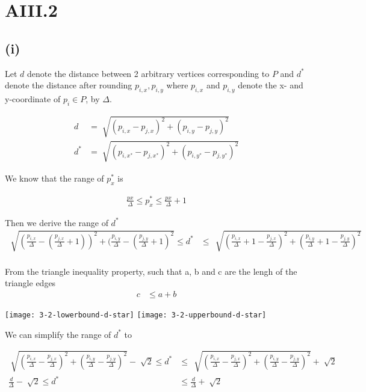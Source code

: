 \section* {AIII.2}
\label {a3-2}
\subsection*{(i)}

Let $d$ denote the distance between 2 arbitrary vertices corresponding to $P$ and $d^*$ denote the distance after rounding $p_{i,x}, p_{i,y}$
where $p_{i,x}$ and $p_{i,y}$ denote the x- and y-coordinate of $p_i \in P$, by $\Delta$.

\begin{align*}
    d &= \sqrt[]{(p_{i,x} - p_{j,x})^2+ (p_{i,y} - p_{j,y})^2}   \\
    d^* &= \sqrt[]{(p_{i,x^*} - p_{j,x^*})^2+ (p_{i,y^*} - p_{j,y^*})^2}
\end{align*}

We know that the range of $p_x^*$  is

\begin{align*}
    \frac{px}{\Delta} \leq p^*_x \leq \frac{px}{\Delta} + 1
\end{align*}

Then we derive the range of $d^*$
\begin{align*}
    \sqrt[]{( \frac{p_{i,x}}{\Delta} - (\frac{p_{j,x}}{\Delta} + 1 ))^2+ (\frac{p_{i,y}}{\Delta} - (\frac{p_{j,y}}{\Delta}+1)^2}
    \leq d^* &\leq \, \sqrt[]{( \frac{p_{i,x}}{\Delta} + 1 - \frac{p_{j,x}}{\Delta})^2+ (\frac{p_{i,y}}{\Delta} + 1 - \frac{p_{j,y}}{\Delta})^2}   \\
\end{align*}

From the triangle inequality property, such that a, b and c are the lengh of the triangle edges
\begin{align*}
    c &\leq a + b
\end{align*}

\texttt{[image: 3-2-lowerbound-d-star]}
\texttt{[image: 3-2-upperbound-d-star]}

We can simplify the range of $d^*$ to

\begin{align*}
    \sqrt[]{( \frac{p_{i,x}}{\Delta} - \frac{p_{j,x}}{\Delta})^2+ (\frac{p_{i,y}}{\Delta} - \frac{p_{j,y}}{\Delta})^2}
     - \sqrt[]{2}
    \leq d^* &\leq \, 
    \sqrt[]{( \frac{p_{i,x}}{\Delta} - \frac{p_{j,x}}{\Delta})^2+ (\frac{p_{i,y}}{\Delta} - \frac{p_{j,y}}{\Delta})^2}
     + \sqrt[]{2} \\
 \frac{d}{\Delta} - \sqrt[]{2} \leq d^* &\leq \frac{d}{\Delta} + \sqrt[]{2}
\end{align*}



